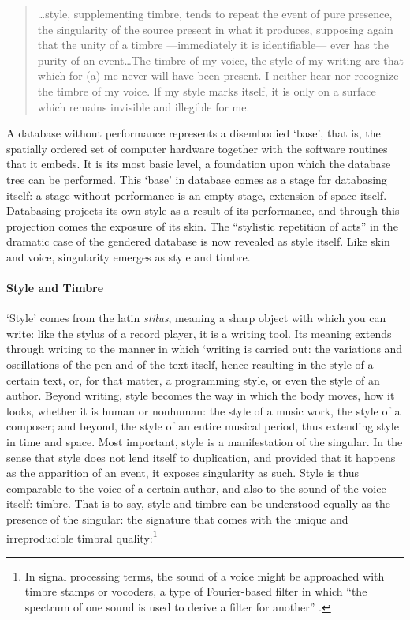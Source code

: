 \begin{quote}
	\dots style, supplementing timbre, tends to repeat the event of pure presence, the singularity of the source present in what it produces, supposing again that the unity of a timbre ---immediately it is identifiable--- ever has the purity of an event\dots The timbre of my voice, the style of my writing are that which for (a) me never will have been present. I neither hear nor recognize the timbre of my voice. If my style marks itself, it is only on a surface which remains invisible and illegible for me. \parencite[296]{Der82:Mar}

\end{quote}

A database without performance represents a disembodied `base', that is, the spatially ordered set of computer hardware together with the software routines that it embeds. It is its most basic level, a foundation upon which the database tree can be performed. This `base' in database comes as a stage for databasing itself: a stage without performance is an empty stage, extension of space itself. Databasing projects its own style as a result of its performance, and through this projection comes the exposure of its skin. The ``stylistic repetition of acts'' in the dramatic case of the gendered database is now revealed as style itself. Like skin and voice, singularity emerges as style and timbre.

\paragraph{Style and Timbre}
`Style' comes from the latin \textit{stilus}, meaning a sharp object with which you can write: like the stylus of a record player, it is a writing tool. Its meaning extends through writing to the manner in which `writing is carried out: the variations and oscillations of the pen and of the text itself, hence resulting in the style of a certain text, or, for that matter, a programming style, or even the style of an author. Beyond writing, style becomes the way in which the body moves, how it looks, whether it is human or nonhuman: the style of a music work, the style of a composer; and beyond, the style of an entire musical period, thus extending style in time and space. Most important, style is a manifestation of the singular. In the sense that style does not lend itself to duplication, and provided that it happens as the apparition of an event, it exposes singularity as such. Style is thus comparable to the voice of a certain author, and also to the sound of the voice itself: timbre. That is to say, style and timbre can be understood equally as the presence of the singular: the signature that comes with the unique and irreproducible timbral quality:\footnote{In signal processing terms, the sound of a voice might be approached with timbre stamps or vocoders, a type of Fourier-based filter in which ``the spectrum of one sound is used to derive a filter for another'' \parencite{DBLP:conf/icmc/Puckette07}.} 

